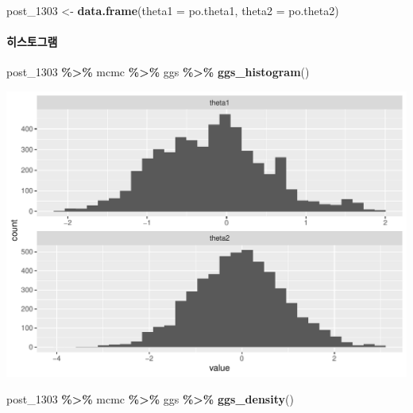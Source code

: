 \documentclass[
]{article}
\newenvironment{Shaded}{\begin{snugshade}}{\end{snugshade}}
\newcommand{\AttributeTok}[1]{\textcolor[rgb]{0.13,0.29,0.53}{#1}}
\newcommand{\FunctionTok}[1]{\textcolor[rgb]{0.13,0.29,0.53}{\textbf{#1}}}
\newcommand{\NormalTok}[1]{#1}
\newcommand{\OtherTok}[1]{\textcolor[rgb]{0.56,0.35,0.01}{#1}}
\newcommand{\SpecialCharTok}[1]{\textcolor[rgb]{0.81,0.36,0.00}{\textbf{#1}}}
\begin{document}
\begin{Shaded}
\begin{Highlighting}[]
\NormalTok{post\_1303 }\OtherTok{\textless{}{-}} \FunctionTok{data.frame}\NormalTok{(}\AttributeTok{theta1 =}\NormalTok{ po.theta1, }\AttributeTok{theta2 =}\NormalTok{ po.theta2)}
\end{Highlighting}
\end{Shaded}

\paragraph{히스토그램}\label{uxd788uxc2a4uxd1a0uxadf8uxb7a8-3}

\begin{Shaded}
\begin{Highlighting}[]
\NormalTok{post\_1303 }\SpecialCharTok{\%\textgreater{}\%}\NormalTok{ mcmc }\SpecialCharTok{\%\textgreater{}\%}\NormalTok{ ggs }\SpecialCharTok{\%\textgreater{}\%} \FunctionTok{ggs\_histogram}\NormalTok{()}
\end{Highlighting}
\end{Shaded}

\begin{center}\includegraphics[width=0.8\linewidth]{Bayes_stat_hw3_files/figure-latex/unnamed-chunk-24-1} \end{center}

\begin{Shaded}
\begin{Highlighting}[]
\NormalTok{post\_1303 }\SpecialCharTok{\%\textgreater{}\%}\NormalTok{ mcmc }\SpecialCharTok{\%\textgreater{}\%}\NormalTok{ ggs }\SpecialCharTok{\%\textgreater{}\%} \FunctionTok{ggs\_density}\NormalTok{()}
\end{Highlighting}
\end{Shaded}
\end{document}
